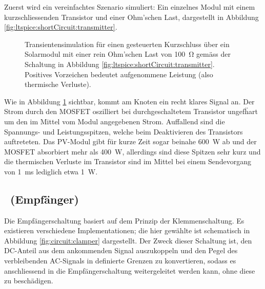 Zuerst wird ein vereinfachtes Szenario simuliert: Ein einzelnes Modul mit einem
kurzschliessenden Transistor und einer Ohm'schen Last, dargestellt in Abbildung
\ref{fig:ltspice:shortCircuit:transmitter}.


\begin{figure}[h!tb]
    
    \caption[Simulationsergebnisse Kurzschlussmethode, Sender]{%
        Transientensimulation    f\"ur     einen    gesteuerten    Kurzschluss
        \"uber     ein     Solarmodul     mit     einer     rein     Ohm'schen
        Last      von      \SI{100}{\ohm}     gem\"ass      der      Schaltung
        in   Abbildung   \ref{fig:ltspice:shortCircuit:transmitter}. Positives
        Vorzeichen bedeutet aufgenommene Leistung (also thermische Verluste).%
    }
    \label{fig:simu:shortCircuit:transmitter}
\end{figure}


Wie  in Abbildung  \ref{fig:simu:shortCircuit:transmitter} sichtbar,  kommt am
Knoten  ein  recht klares Signal an. Der Strom  durch den MOSFET
oszilliert bei durchgeschaltetem  Transistor ungef\"hart um den  im Mittel vom
Modul angegebenen Strom. Auffallend sind  die Spannungs- und Leistungsspitzen,
welche beim Deaktivieren des  Transistors auftreteten. Das PV-Modul gibt f\"ur
kurze  Zeit  sogar  beinahe  \SI{600}{\watt}  ab  und  der  MOSFET  absorbiert
mehr  als \SI{400}{\watt},  allerdings sind  diese Spitzen  sehr kurz  und die
thermischen Verluste im  Transistor sind im Mittel bei  einem Sendevorgang von
\SI{1}{\milli\second} lediglich etwa \SI{1}{\watt}.


\clearpage
\subsection{\Master~(Empf\"anger)}
\label{subsec:simu:ask:recv}

Die  Empf\"angerschaltung basiert  auf  dem  Prinzip der  Klemmenschaltung. Es
existieren verschiedene Implementationen; die  hier gew\"ahlte ist schematisch
in Abbildung \ref{fig:circuit:clamper} dargestellt. Der Zweck dieser Schaltung
ist, den DC-Anteil  aus dem ankommenden Signal auszukoppeln und  den Pegel des
verbleibenden  AC-Signals in  definierte  Grenzen zu  konvertieren, sodass  es
anschliessend  in die  Empf\"angerschaltung weitergeleitet  werden kann,  ohne
diese zu besch\"adigen.

